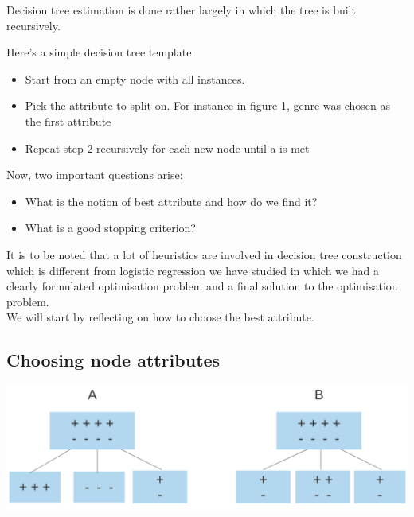 Decision tree estimation is done rather largely  in which the tree is built recursively.

\vspace{2 mm}

Here's a simple decision tree template:
\begin{itemize}
  \setlength\itemsep{0pt}
  \item Start from an empty node with all instances.
  \item Pick the  attribute to split on. For instance in figure 1, genre was chosen as the first attribute
  \item Repeat step 2 recursively for each new node until a  is met
\end{itemize}
\vspace{2mm}

Now, two important questions arise:
\begin{itemize}
  \setlength\itemsep{0pt}
  \item What is the notion of best attribute and how do we find it?
  \item What is a good stopping criterion?
\end{itemize}
\vspace{2mm}

It is to be noted that a lot of heuristics are involved in decision tree construction which is different from logistic regression we have studied in which we had a clearly formulated optimisation problem and a final solution to the optimisation problem. \\

We will start by reflecting on how to choose the best attribute.

\subsection{Choosing node attributes}

\begin{center}
  \includegraphics[width=\textwidth]{images/05_10.png}
\end{center}

